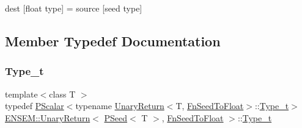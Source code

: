 dest \mbox{[}float type\mbox{]} = source \mbox{[}seed type\mbox{]} 

\subsection{Member Typedef Documentation}
\mbox{\label{structENSEM_1_1UnaryReturn_3_01PSeed_3_01T_01_4_00_01FnSeedToFloat_01_4_a0162324945d4cff5d69aa1ee87641522}} 
\subsubsection{\texorpdfstring{Type\_t}{Type\_t}\hspace{0.1cm}{\footnotesize\ttfamily [1/2]}}
{\footnotesize\ttfamily template$<$class T $>$ \\
typedef \mbox{\hyperlink{classENSEM_1_1PScalar}{P\+Scalar}}$<$typename \mbox{\hyperlink{structENSEM_1_1UnaryReturn}{Unary\+Return}}$<$T, \mbox{\hyperlink{structENSEM_1_1FnSeedToFloat}{Fn\+Seed\+To\+Float}}$>$\+::\mbox{\hyperlink{structENSEM_1_1UnaryReturn_3_01PSeed_3_01T_01_4_00_01FnSeedToFloat_01_4_a0162324945d4cff5d69aa1ee87641522}{Type\+\_\+t}}$>$ \mbox{\hyperlink{structENSEM_1_1UnaryReturn}{E\+N\+S\+E\+M\+::\+Unary\+Return}}$<$ \mbox{\hyperlink{classENSEM_1_1PSeed}{P\+Seed}}$<$ T $>$, \mbox{\hyperlink{structENSEM_1_1FnSeedToFloat}{Fn\+Seed\+To\+Float}} $>$\+::\mbox{\hyperlink{structENSEM_1_1UnaryReturn_3_01PSeed_3_01T_01_4_00_01FnSeedToFloat_01_4_a0162324945d4cff5d69aa1ee87641522}{Type\+\_\+t}}}

\mbox{\label{structENSEM_1_1UnaryReturn_3_01PSeed_3_01T_01_4_00_01FnSeedToFloat_01_4_a0162324945d4cff5d69aa1ee87641522}} 
